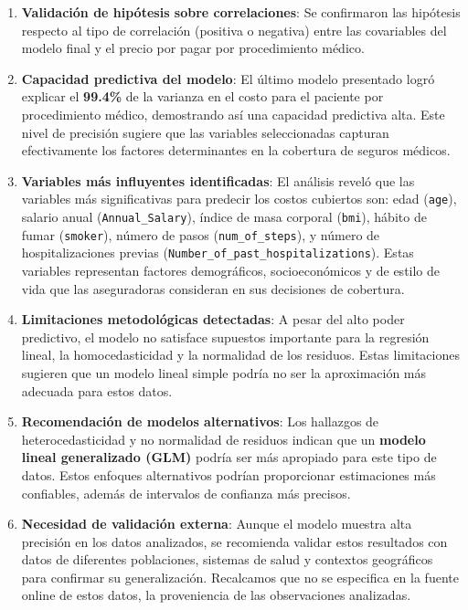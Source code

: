 \documentclass[
]{article}
\begin{document}
\begin{enumerate}
\def\labelenumi{\arabic{enumi}.}
\item
  \textbf{Validación de hipótesis sobre correlaciones}: Se confirmaron
  las hipótesis respecto al tipo de correlación (positiva o negativa)
  entre las covariables del modelo final y el precio por pagar por
  procedimiento médico.
\item
  \textbf{Capacidad predictiva del modelo}: El último modelo presentado
  logró explicar el \textbf{99.4\%} de la varianza en el costo para el
  paciente por procedimiento médico, demostrando así una capacidad
  predictiva alta. Este nivel de precisión sugiere que las variables
  seleccionadas capturan efectivamente los factores determinantes en la
  cobertura de seguros médicos.
\item
  \textbf{Variables más influyentes identificadas}: El análisis reveló
  que las variables más significativas para predecir los costos
  cubiertos son: edad (\texttt{age}), salario anual
  (\texttt{Annual\_Salary}), índice de masa corporal (\texttt{bmi}),
  hábito de fumar (\texttt{smoker}), número de pasos
  (\texttt{num\_of\_steps}), y número de hospitalizaciones previas
  (\texttt{Number\_of\_past\_hospitalizations}). Estas variables
  representan factores demográficos, socioeconómicos y de estilo de vida
  que las aseguradoras consideran en sus decisiones de cobertura.
\item
  \textbf{Limitaciones metodológicas detectadas}: A pesar del alto poder
  predictivo, el modelo no satisface supuestos importante para la
  regresión lineal, la homocedasticidad y la normalidad de los residuos.
  Estas limitaciones sugieren que un modelo lineal simple podría no ser
  la aproximación más adecuada para estos datos.
\item
  \textbf{Recomendación de modelos alternativos}: Los hallazgos de
  heterocedasticidad y no normalidad de residuos indican que un
  \textbf{modelo lineal generalizado (GLM)} podría ser más apropiado
  para este tipo de datos. Estos enfoques alternativos podrían
  proporcionar estimaciones más confiables, además de intervalos de
  confianza más precisos.
\item
  \textbf{Necesidad de validación externa}: Aunque el modelo muestra
  alta precisión en los datos analizados, se recomienda validar estos
  resultados con datos de diferentes poblaciones, sistemas de salud y
  contextos geográficos para confirmar su generalización. Recalcamos que
  no se especifica en la fuente online de estos datos, la proveniencia
  de las observaciones analizadas.
\end{enumerate}
\end{document}
